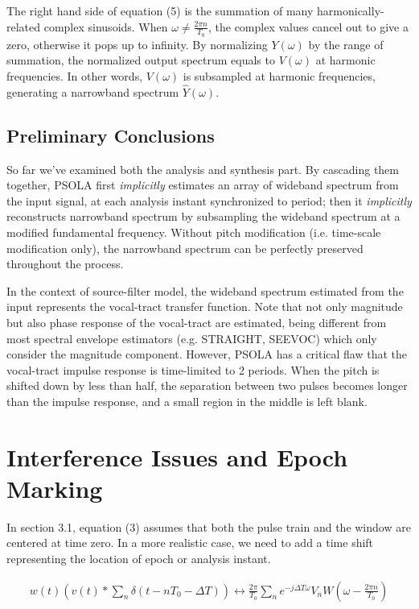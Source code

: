 \documentclass{article}
\begin{document}
The right hand side of equation (5) is the summation of many harmonically-related complex sinusoids. When $\omega \neq \frac{2\pi n}{T_0}$, the complex values cancel out to give a zero, otherwise it pops up to infinity. By normalizing $Y(\omega)$ by the range of summation, the normalized output spectrum equals to $V(\omega)$ at harmonic frequencies. In other words, $V(\omega)$ is subsampled at harmonic frequencies,  generating a narrowband spectrum $\hat Y(\omega)$.

\subsection{Preliminary Conclusions}

So far we've examined both the analysis and synthesis part. By cascading them together, PSOLA first \emph{implicitly} estimates an array of wideband spectrum from the input signal, at each analysis instant synchronized to period; then it \emph{implicitly} reconstructs narrowband spectrum by subsampling the wideband spectrum at a modified fundamental frequency. Without pitch modification (i.e. time-scale modification only), the narrowband spectrum can be perfectly preserved throughout the process.

In the context of source-filter model, the wideband spectrum estimated from the input represents the vocal-tract transfer function. Note that not only magnitude but also phase response of the vocal-tract are estimated, being different from most spectral envelope estimators (e.g. STRAIGHT, SEEVOC) which only consider the magnitude component. However, PSOLA has a critical flaw that the vocal-tract impulse response is time-limited to 2 periods. When the pitch is shifted down by less than half, the separation between two pulses becomes longer than the impulse response, and a small region in the middle is left blank.

\section{Interference Issues and Epoch Marking}

In section 3.1, equation (3) assumes that both the pulse train and the window are centered at time zero. In a more realistic case, we need to add a time shift representing the location of epoch or analysis instant.

\begin{align}
w(t) \left(v(t) \ast \sum_n \delta(t - nT_0 - \Delta T) \right) \leftrightarrow \frac{2\pi}{T_0} \sum_n e^{-j\Delta T \omega} V_n W(\omega - \frac{2\pi n}{T_0})
\end{align}
\end{document}
